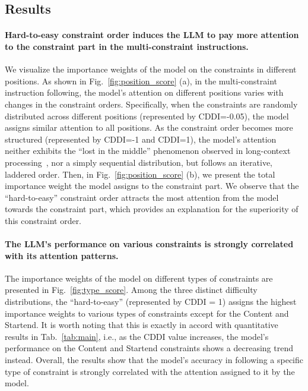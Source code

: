 \subsection{Results}
\paragraph*{Hard-to-easy constraint order induces the LLM to pay more attention to the constraint part in the multi-constraint instructions.} We visualize the importance weights of the model on the constraints in different positions. As shown in Fig.~\ref{fig:position_score} (a), in the multi-constraint instruction following, the model's attention on different positions varies with changes in the constraint orders. Specifically, when the constraints are randomly distributed across different positions (represented by CDDI=-0.05), the model assigns similar attention to all positions. As the constraint order becomes more structured (represented by CDDI=-1 and CDDI=1), the model's attention neither exhibits the “lost in the middle” phenomenon observed in long-context processing~\cite{liu2024lost}, nor a simply sequential distribution, but follows an iterative, laddered order. Then, in Fig.~\ref{fig:position_score} (b), we present the total importance weight the model assigns to the constraint part. We observe that the “hard-to-easy” constraint order attracts the most attention from the model towards the constraint part, which provides an explanation for the superiority of this constraint order.

\paragraph*{The LLM's performance on various constraints is strongly correlated with its attention patterns.} The importance weights of the model on different types of constraints are presented in Fig.~\ref{fig:type_score}. Among the three distinct difficulty distributions, the “hard-to-easy” (represented by CDDI = 1) assigns the highest importance weights to various types of constraints except for the Content and Startend. It is worth noting that this is exactly in accord with quantitative results in Tab.~\ref{tab:main}, i.e., as the CDDI value increases, the model's performance on the Content and Startend constraints shows a decreasing trend instead. Overall, the results show that the model's accuracy in following a specific type of constraint is strongly correlated with the attention assigned to it by the model.